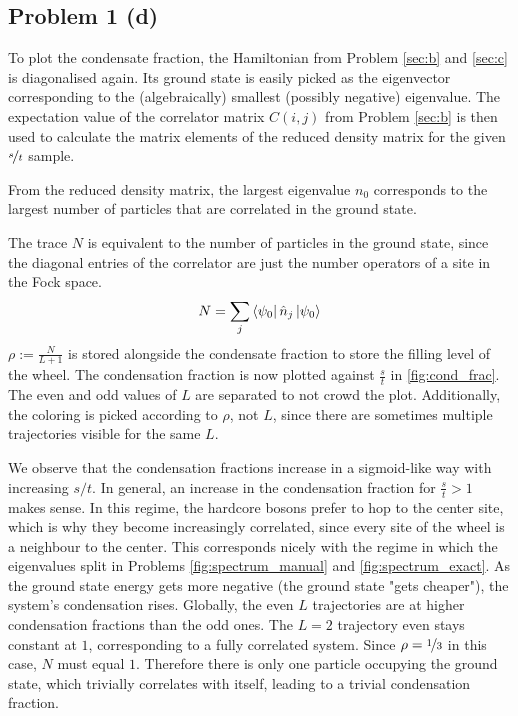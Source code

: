 \subsection{Problem 1 (d)}
    \label{sec:d}
    
    To plot the condensate fraction, the Hamiltonian from Problem \ref{sec:b} and \ref{sec:c} is diagonalised again. Its ground state is easily picked as the eigenvector corresponding to the (algebraically) smallest (possibly negative) eigenvalue. The expectation value of the correlator matrix $C(i,j)$ from Problem \ref{sec:b} is then used to calculate the matrix elements of the reduced density matrix for the given $\nicefrac{s}{t}$ sample. 
    
    From the reduced density matrix, the largest eigenvalue $n_0$ corresponds to the largest number of particles that are correlated in the ground state.
    
    The trace $N$ is equivalent to the number of particles in the ground state, since the diagonal entries of the correlator are just the number operators of a site in the Fock space.
    \begin{align}
        N = \sum_j \bra{\psi_0}\hat{n}_j\ket{\psi_0}
    \end{align}
    $\rho := \frac{N}{L+1}$ is stored alongside the condensate fraction to store the filling level of the wheel. The condensation fraction is now plotted against $\frac{s}{t}$ in \autoref{fig:cond_frac}. The even and odd values of $L$ are separated to not crowd the plot. Additionally, the coloring is picked according to $\rho$, not $L$, since there are sometimes multiple trajectories visible for the same $L$.

    We observe that the condensation fractions increase in a sigmoid-like way with increasing $s/t$. In general, an increase in the condensation fraction for $\frac{s}{t} > 1$ makes sense. In this regime, the hardcore bosons prefer to hop to the center site, which is why they become increasingly correlated, since every site of the wheel is a neighbour to the center. This corresponds nicely with the regime in which the eigenvalues split in Problems \ref{fig:spectrum_manual} and \ref{fig:spectrum_exact}. As the ground state energy gets more negative (the ground state "gets cheaper"), the system's condensation rises. Globally, the even $L$ trajectories are at higher condensation fractions than the odd ones. The $L=2$ trajectory even stays constant at $1$, corresponding to a fully correlated system. Since $\rho = \nicefrac{1}{3}$ in this case, $N$ must equal $1$. Therefore there is only one particle occupying the ground state, which trivially correlates with itself, leading to a trivial condensation fraction.
            
